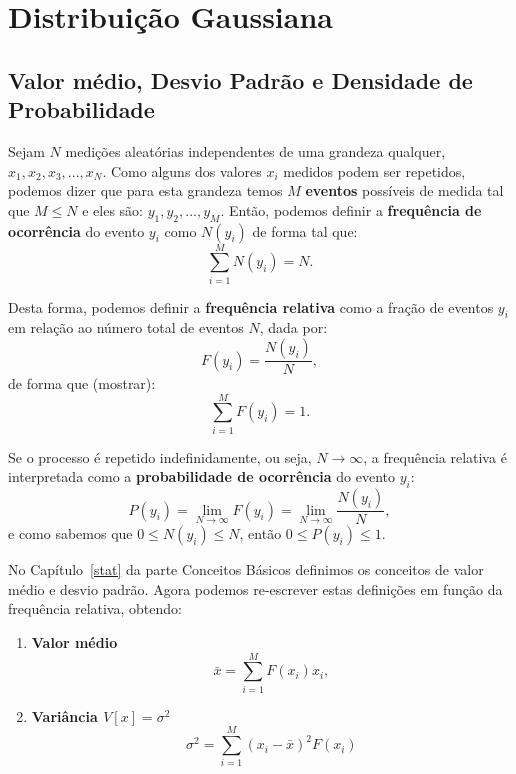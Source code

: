 \chapter{Distribuição Gaussiana}
\label{sec:gauss}

\vspace{-0.7cm}

\section*{Valor médio, Desvio Padrão e Densidade de Probabilidade}

Sejam $N$ medições aleatórias independentes de uma grandeza qualquer, $x_1, x_2, x_3, ... , x_N$. Como alguns dos valores $x_i$ medidos podem ser repetidos, podemos dizer que para esta grandeza temos $M$ {\bf eventos} possíveis de medida tal que $M \leq N$ e eles são: $y_1, y_2, ..., y_M$. Então, podemos definir a {\bf frequência de ocorrência} do evento $y_i$ como $N(y_i)$ de forma tal que:
\begin{equation}
\sum_{i=1}^M N(y_i) = N.
\end{equation}
\noindent

Desta forma, podemos definir a {\bf frequência relativa} como a fração de eventos $y_i$ em relação ao número total de eventos $N$, dada por:
\begin{equation}
F(y_i) = \frac{N(y_i)}{N},
\label{eq:freqrel}
\end{equation}
\noindent
de forma que (mostrar):
\begin{equation}
\sum_{i=1}^M F(y_i) = 1.
\end{equation}
\noindent

Se o processo é repetido indefinidamente, ou seja, $N \longrightarrow \infty$, a frequência relativa é interpretada como a {\bf probabilidade de ocorrência} do evento $y_i$:
\begin{equation}
P(y_i) = \lim_{N \to \infty} F(y_i) = \lim_{N \to \infty} \frac{N(y_i)}{N},
\end{equation}
\noindent
e como sabemos que $0  \leq N(y_i) \leq N$, então $0  \leq P(y_i) \leq 1$.

No Capítulo~\ref{stat} da parte Conceitos Básicos definimos os conceitos de valor médio e desvio padrão. Agora podemos re-escrever estas definições em função da frequência relativa, obtendo:

\begin{enumerate}
\item {\bf Valor médio}
\begin{equation}
\bar{x} = \sum_{i = 1}^M F(x_i){x_i},
\end{equation}
\noindent

\item {\bf Variância $V[x] = \sigma^2$}
\begin{equation}
\sigma^2 = \sum_{i=1}^M (x_i - \bar{x})^2 F(x_i)
\end{equation}
\noindent
\vspace{-1.cm}
\end{enumerate}
 
